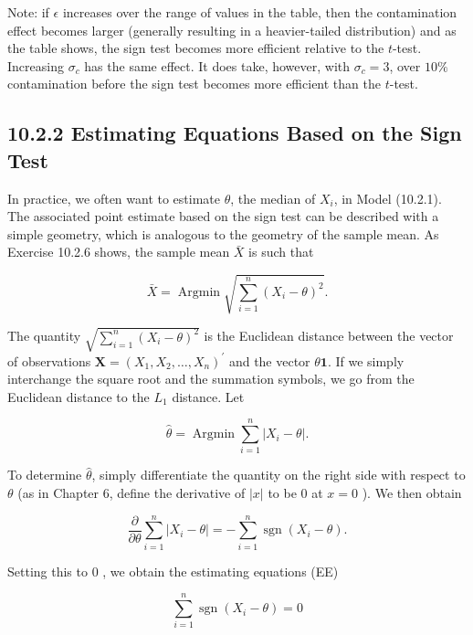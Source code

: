 Note: if $\epsilon$ increases over the range of values in the table, then the contamination effect becomes larger (generally resulting in a heavier-tailed distribution) and as the table shows, the sign test becomes more efficient relative to the $t$-test. Increasing $\sigma_{c}$ has the same effect. It does take, however, with $\sigma_{c}=3$, over $10 \%$ contamination before the sign test becomes more efficient than the $t$-test.

\subsection*{10.2.2 Estimating Equations Based on the Sign Test}
In practice, we often want to estimate $\theta$, the median of $X_{i}$, in Model (10.2.1). The associated point estimate based on the sign test can be described with a simple geometry, which is analogous to the geometry of the sample mean. As Exercise 10.2.6 shows, the sample mean $\bar{X}$ is such that


\begin{equation*}
\bar{X}=\operatorname{Argmin} \sqrt{\sum_{i=1}^{n}\left(X_{i}-\theta\right)^{2}} . \tag{10.2.32}
\end{equation*}


The quantity $\sqrt{\sum_{i=1}^{n}\left(X_{i}-\theta\right)^{2}}$ is the Euclidean distance between the vector of observations $\mathbf{X}=\left(X_{1}, X_{2}, \ldots, X_{n}\right)^{\prime}$ and the vector $\theta \mathbf{1}$. If we simply interchange the square root and the summation symbols, we go from the Euclidean distance to the $L_{1}$ distance. Let


\begin{equation*}
\widehat{\theta}=\operatorname{Argmin} \sum_{i=1}^{n}\left|X_{i}-\theta\right| . \tag{10.2.33}
\end{equation*}


To determine $\widehat{\theta}$, simply differentiate the quantity on the right side with respect to $\theta$ (as in Chapter 6, define the derivative of $|x|$ to be 0 at $x=0$ ). We then obtain

$$
\frac{\partial}{\partial \theta} \sum_{i=1}^{n}\left|X_{i}-\theta\right|=-\sum_{i=1}^{n} \operatorname{sgn}\left(X_{i}-\theta\right) .
$$

Setting this to 0 , we obtain the estimating equations (EE)


\begin{equation*}
\sum_{i=1}^{n} \operatorname{sgn}\left(X_{i}-\theta\right)=0 \tag{10.2.34}
\end{equation*}


